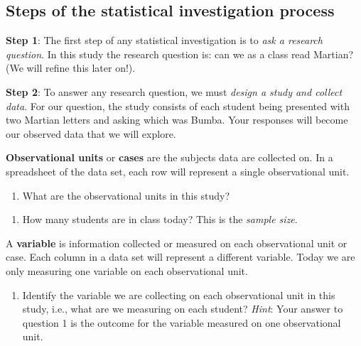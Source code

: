 \documentclass[
]{report}
\providecommand{\tightlist}{%
  \setlength{\itemsep}{0pt}\setlength{\parskip}{0pt}}
\begin{document}
\vspace{0.3in}

\hypertarget{steps-of-the-statistical-investigation-process}{%
\subsection*{Steps of the statistical investigation process}\label{steps-of-the-statistical-investigation-process}}

\textbf{Step 1}: The first step of any statistical investigation is to \emph{ask a research question}. In this study the research question is: can we as a class read Martian? (We will refine this later on!).

\textbf{Step 2}: To answer any research question, we must \emph{design a study and collect data}. For our question, the study consists of each student being presented with two Martian letters and asking which was Bumba. Your responses will become our observed data that we will explore.

\newpage

\textbf{Observational units} or \textbf{cases} are the subjects data are collected on. In a spreadsheet of the data set, each row will represent a single observational unit.

\begin{enumerate}
\def\labelenumi{\arabic{enumi}.}
\setcounter{enumi}{1}
\tightlist
\item
  What are the observational units in this study?
\end{enumerate}

\vspace{0.4in}

\begin{enumerate}
\def\labelenumi{\arabic{enumi}.}
\setcounter{enumi}{2}
\tightlist
\item
  How many students are in class today? This is the \emph{sample size}.
\end{enumerate}

\vspace{0.3in}

A \textbf{variable} is information collected or measured on each observational unit or case. Each column in a data set will represent a different variable. Today we are only measuring one variable on each observational unit.

\begin{enumerate}
\def\labelenumi{\arabic{enumi}.}
\setcounter{enumi}{3}
\tightlist
\item
  Identify the variable we are collecting on each observational unit in this study, i.e., what are we measuring on each student? \emph{Hint}: Your answer to question 1 is the outcome for the variable measured on one observational unit.
\end{enumerate}
\end{document}
